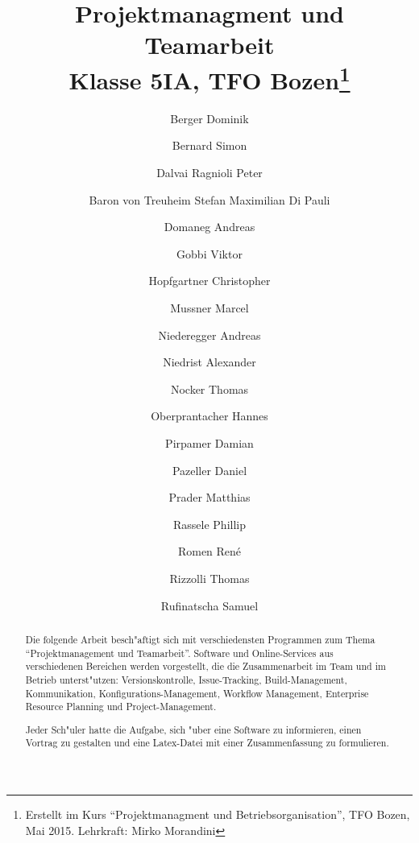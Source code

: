 \documentclass{article}
\title{Projektmanagment und Teamarbeit\\Klasse 5IA, TFO Bozen\thanks{Erstellt 
im Kurs ``Projektmanagment und Betriebsorganisation'', TFO Bozen, Mai 2015. Lehrkraft: Mirko Morandini}}
\author{Berger Dominik
\and Bernard Simon
\and Dalvai Ragnioli Peter
\and Baron von Treuheim Stefan Maximilian Di Pauli
\and Domaneg Andreas
\and Gobbi Viktor
\and Hopfgartner Christopher
\and Mussner Marcel
\and Niederegger Andreas
\and Niedrist Alexander
\and Nocker Thomas
\and Oberprantacher Hannes
\and Pirpamer Damian
\and Pazeller Daniel
\and Prader Matthias
\and Rassele Phillip
\and Romen Ren\'e 
\and Rizzolli Thomas
\and Rufinatscha Samuel}
\begin{document}
\maketitle


\begin{abstract}
Die folgende Arbeit besch"aftigt sich mit verschiedensten Programmen zum Thema ``Projektmanagement und Teamarbeit''.
Software und Online-Services aus verschiedenen Bereichen werden vorgestellt, die die Zusammenarbeit im Team und im Betrieb unterst"utzen: Versionskontrolle, Issue-Tracking, Build-Management, Kommunikation, Konfigurations-Management, Workflow Management, Enterprise Resource Planning und Project-Management.

Jeder Sch"uler hatte die Aufgabe, sich "uber eine Software zu informieren, einen Vortrag zu gestalten und eine Latex-Datei mit einer Zusammenfassung zu formulieren. 
\end{abstract}

\newpage


\begin{sloppypar}
\tableofcontents
\listoffigures

\newpage




















\end{sloppypar}
\end{document}
